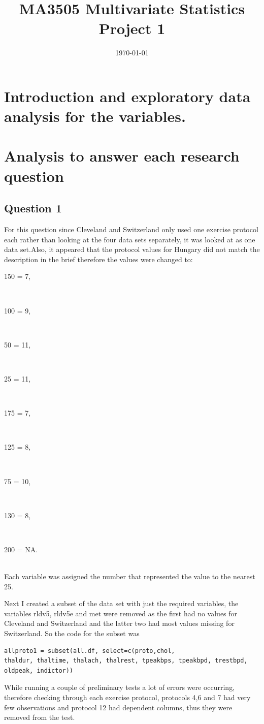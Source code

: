 \documentclass[a4paper]{article}
\title{MA3505 Multivariate Statistics Project 1}
\date{\today}
\begin{document}
\maketitle


\section{Introduction and exploratory data analysis for the variables.}


\section{Analysis to answer each research question}

\subsection{Question 1}
For this question since Cleveland and Switzerland only used one exercise protocol each rather than looking at the four data sets separately, it was looked at as one data set.Also, it appeared that the protocol values for Hungary did not match the description in the brief therefore the values were changed to:\\
\centerline{150 = 7,}\\
\centerline{100 = 9,}\\
\centerline{50 = 11,}\\
\centerline{25 = 11,}\\
\centerline{175 = 7,}\\
\centerline{125 = 8,}\\
\centerline{75 = 10,}\\
\centerline{130 = 8,}\\
\centerline{200 = NA.}\\
Each variable was assigned the number that represented the value to the nearest 25.

Next I created a subset of the data set with just the required variables, the variables rldv5, rldv5e and met were removed as the first had no values for Cleveland and Switzerland and the latter two had most values missing for Switzerland. So the code for the subset was
\begin{lstlisting}[frame=single]
allproto1 = subset(all.df, select=c(proto,chol,
thaldur, thaltime, thalach, thalrest, tpeakbps, tpeakbpd, trestbpd,
oldpeak, indictor))
\end{lstlisting}

While running a couple of preliminary tests a lot of errors were occurring, therefore checking through each exercise protocol, protocols 4,6 and 7 had very few observations and protocol 12 had dependent columns, thus they were removed from the test.
\end{document}
